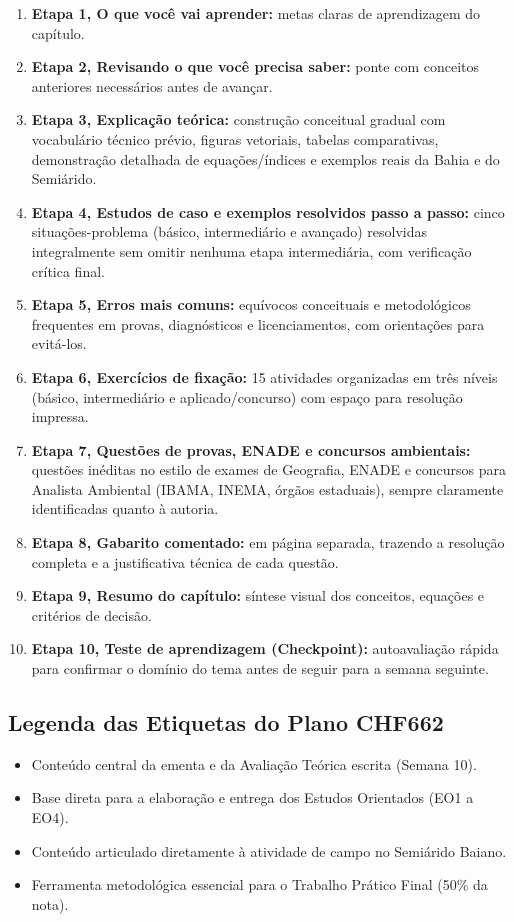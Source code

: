 \begin{enumerate}[leftmargin=1.8em, itemsep=2.5pt]
  \item \textbf{Etapa 1, O que você vai aprender:} metas claras de aprendizagem do capítulo.
  \item \textbf{Etapa 2, Revisando o que você precisa saber:} ponte com conceitos anteriores necessários antes de avançar.
  \item \textbf{Etapa 3, Explicação teórica:} construção conceitual gradual com vocabulário técnico prévio, figuras vetoriais, tabelas comparativas, demonstração detalhada de equações/índices e exemplos reais da Bahia e do Semiárido.
  \item \textbf{Etapa 4, Estudos de caso e exemplos resolvidos passo a passo:} cinco situações-problema (básico, intermediário e avançado) resolvidas integralmente sem omitir nenhuma etapa intermediária, com verificação crítica final.
  \item \textbf{Etapa 5, Erros mais comuns:} equívocos conceituais e metodológicos frequentes em provas, diagnósticos e licenciamentos, com orientações para evitá-los.
  \item \textbf{Etapa 6, Exercícios de fixação:} 15 atividades organizadas em três níveis (básico, intermediário e aplicado/concurso) com espaço para resolução impressa.
  \item \textbf{Etapa 7, Questões de provas, ENADE e concursos ambientais:} questões inéditas no estilo de exames de Geografia, ENADE e concursos para Analista Ambiental (IBAMA, INEMA, órgãos estaduais), sempre claramente identificadas quanto à autoria.
  \item \textbf{Etapa 8, Gabarito comentado:} em página separada, trazendo a resolução completa e a justificativa técnica de cada questão.
  \item \textbf{Etapa 9, Resumo do capítulo:} síntese visual dos conceitos, equações e critérios de decisão.
  \item \textbf{Etapa 10, Teste de aprendizagem (Checkpoint):} autoavaliação rápida para confirmar o domínio do tema antes de seguir para a semana seguinte.
\end{enumerate}

\subsection*{Legenda das Etiquetas do Plano CHF662}
\begin{itemize}[leftmargin=1.5em, itemsep=4pt]
  \item \tagEmenta\quad Conteúdo central da ementa e da Avaliação Teórica escrita (Semana 10).
  \item {}\quad Base direta para a elaboração e entrega dos Estudos Orientados (EO1 a EO4).
  \item \tagCampo\quad Conteúdo articulado diretamente à atividade de campo no Semiárido Baiano.
  \item \tagPratica\quad Ferramenta metodológica essencial para o Trabalho Prático Final (50\% da nota).
\end{itemize}
